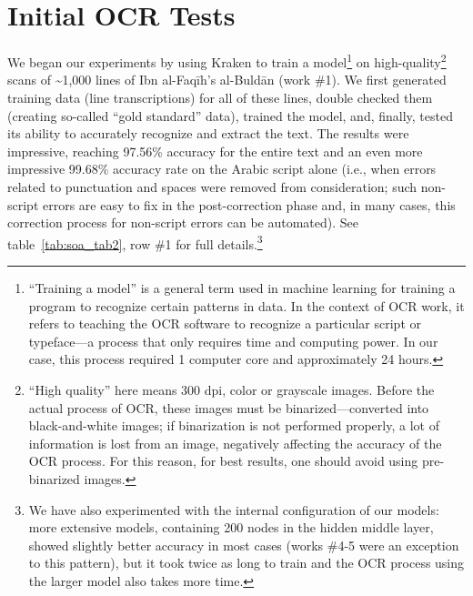 \section{Initial OCR Tests}

We began our experiments by using Kraken to train a model\footnote{“Training a
model” is a general term used in machine learning for training a program to
recognize certain patterns in data. In the context of OCR work, it refers to
teaching the OCR software to recognize a particular script or typeface—a
process that only requires time and computing power. In our case, this process
required 1 computer core and approximately 24 hours.} on
high-quality\footnote{“High quality” here means 300 dpi, color or grayscale
images. Before the actual process of OCR, these images must be
binarized—converted into black-and-white images; if binarization is not
performed properly, a lot of information is lost from an image, negatively
affecting the accuracy of the OCR process. For this reason, for best results,
one should avoid using pre-binarized images.} scans of \textasciitilde1,000 lines of
Ibn al-Faqīh’s al-Buldān (work \#1). We first generated training data (line
transcriptions) for all of these lines, double checked them (creating so-called
“gold standard” data), trained the model, and, finally,
tested its ability to accurately recognize and extract the text. The results
were impressive, reaching 97.56\% accuracy for the entire text and an even more
impressive 99.68\% accuracy rate on the Arabic script alone (i.e., when errors
related to punctuation and spaces were removed from consideration; such
non-script errors are easy to fix in the post-correction phase and, in many
cases, this correction process for non-script errors can be automated). See
table~\ref{tab:soa_tab2}, row \#1 for full details.\footnote{We have also experimented with the
internal configuration of our models: more extensive models, containing 200
nodes in the hidden middle layer, showed slightly better accuracy in most cases
(works \#4-5 were an exception to this pattern), but it took twice as long to
train and the OCR process using the larger model also takes more time.}

